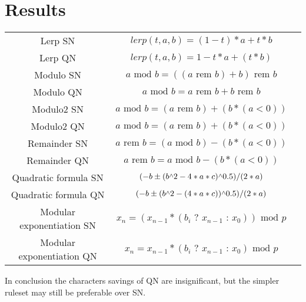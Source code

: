 \documentclass[twoside]{article}
\newcommand{\T}[1]{\textrm{#1}} %
\newcommand{\caret}{\raisebox{0.5ex}{$\scriptstyle\wedge$}}
\newcommand{\rem}{\T{ rem }}
\newcommand{\mod}{\T{ mod }}
\newcommand{\ifelse}[3]{#1\T{ ? }#2\T{ : }#3}
\newcommand{\plusminus}{\pm}
\begin{document}
    \section{Results}
        \begin{center}
        \begin{tabular}{ccc}
            \hline
            Lerp SN & $ lerp(t, a, b) = (1 - t) * a + t * b $\\
            Lerp QN & $ lerp(t, a, b) = 1 - t * a + (t * b) $\\
            Modulo SN & $ a \mod b = ((a \rem b) + b) \rem b $\\
            Modulo QN & $ a \mod b = a \rem b + b \rem b $\\
            Modulo2 SN & $ a \mod b = (a \rem b) + (b * (a < 0)) $\\
            Modulo2 QN & $ a \mod b = (a \rem b) + (b * (a < 0)) $\\
            Remainder SN & $ a \rem b = (a \mod b) - (b * (a < 0)) $\\
            Remainder QN & $ a \rem b = a \mod b - (b * (a < 0)) $\\
            Quadratic formula SN & $ (-b \plusminus (b \caret 2 - 4 * a * c) \caret 0.5) / (2 * a) $\\
            Quadratic formula QN & $ (-b \plusminus (b \caret 2 - (4 * a * c)) \caret 0.5) / (2 * a) $\\
            Modular exponentiation SN & $ x_n = (x_{n-1} * (\ifelse{b_i}{x_{n-1}}{x_0})) \mod p$\\
            Modular exponentiation QN & $ x_n = x_{n-1} * (\ifelse{b_i}{x_{n-1}}{x_0}) \mod p$\\
            \hline
        \end{tabular}
        \end{center}
        \par\vspace{5px}
            In conclusion the characters savings of QN are insignificant,
            but the simpler ruleset may still be preferable over SN.
\end{document}
